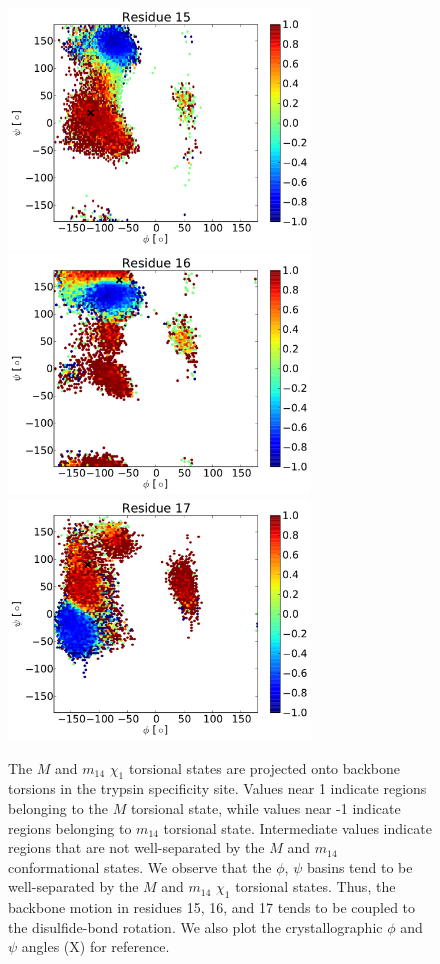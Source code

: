 \documentclass[journal=jacsat,manuscript=article]{achemso}
\begin{document}
\begin{figure}
\includegraphics[width=8cm]{figures/BPTI_backbone_torsion_states_15.pdf}
\includegraphics[width=8cm]{figures/BPTI_backbone_torsion_states_16.pdf}
\includegraphics[width=8cm]{figures/BPTI_backbone_torsion_states_17.pdf}
\caption{
The $M$ and $m_{14}$ $\chi_1$ torsional states are projected onto backbone torsions in the trypsin specificity site.  Values near 1 indicate regions belonging to the $M$ torsional state, while values near -1 indicate regions belonging to $m_{14}$ torsional state.  Intermediate values indicate regions that are not well-separated by the $M$ and $m_{14}$ conformational states.  We observe that the $\phi$, $\psi$ basins tend to be well-separated by the $M$ and $m_{14}$ $\chi_1$ torsional states.  Thus, the backbone motion in residues 15, 16, and 17 tends to be coupled to the disulfide-bond rotation.  We also plot the crystallographic $\phi$ and $\psi$ angles (X) for reference.  
}
\label{figure:bpti_backbone_states}
\end{figure}
\end{document}
